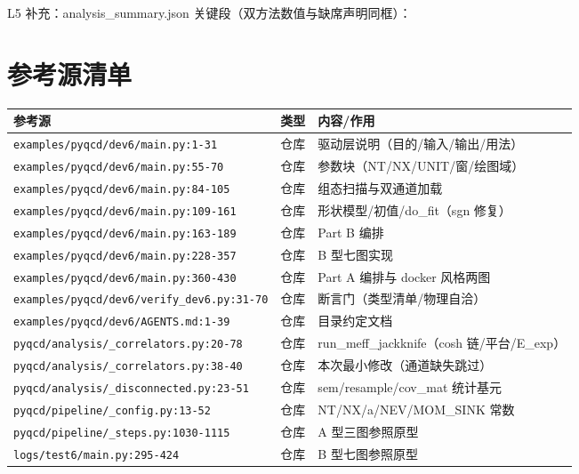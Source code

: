 \documentclass[UTF8]{ctexart}
\begin{document}
L5 补充：analysis\_summary.json 关键段（双方法数值与缺席声明同框）：


\section{参考源清单}
\begin{xltabular}{\textwidth}{llX}
\toprule
\textcolor{evidence}{参考源} & 类型 & 内容/作用 \\
\midrule
\endhead
\texttt{\nolinkurl{examples/pyqcd/dev6/main.py:1-31}} & 仓库 & 驱动层说明（目的/输入/输出/用法）\\
\texttt{\nolinkurl{examples/pyqcd/dev6/main.py:55-70}} & 仓库 & 参数块（NT/NX/UNIT/窗/绘图域）\\
\texttt{\nolinkurl{examples/pyqcd/dev6/main.py:84-105}} & 仓库 & 组态扫描与双通道加载 \\
\texttt{\nolinkurl{examples/pyqcd/dev6/main.py:109-161}} & 仓库 & 形状模型/初值/do\_fit（sgn 修复）\\
\texttt{\nolinkurl{examples/pyqcd/dev6/main.py:163-189}} & 仓库 & Part B 编排 \\
\texttt{\nolinkurl{examples/pyqcd/dev6/main.py:228-357}} & 仓库 & B 型七图实现 \\
\texttt{\nolinkurl{examples/pyqcd/dev6/main.py:360-430}} & 仓库 & Part A 编排与 docker 风格两图 \\
\texttt{\nolinkurl{examples/pyqcd/dev6/verify\_dev6.py:31-70}} & 仓库 & 断言门（类型清单/物理自洽）\\
\texttt{\nolinkurl{examples/pyqcd/dev6/AGENTS.md:1-39}} & 仓库 & 目录约定文档 \\
\texttt{\nolinkurl{pyqcd/analysis/\_correlators.py:20-78}} & 仓库 & run\_meff\_jackknife（cosh 链/平台/E\_exp）\\
\texttt{\nolinkurl{pyqcd/analysis/\_correlators.py:38-40}} & 仓库 & 本次最小修改（通道缺失跳过）\\
\texttt{\nolinkurl{pyqcd/analysis/\_disconnected.py:23-51}} & 仓库 & sem/resample/cov\_mat 统计基元 \\
\texttt{\nolinkurl{pyqcd/pipeline/\_config.py:13-52}} & 仓库 & NT/NX/a/NEV/MOM\_SINK 常数 \\
\texttt{\nolinkurl{pyqcd/pipeline/\_steps.py:1030-1115}} & 仓库 & A 型三图参照原型 \\
\texttt{\nolinkurl{logs/test6/main.py:295-424}} & 仓库 & B 型七图参照原型 \\

\end{xltabular}
\end{document}
